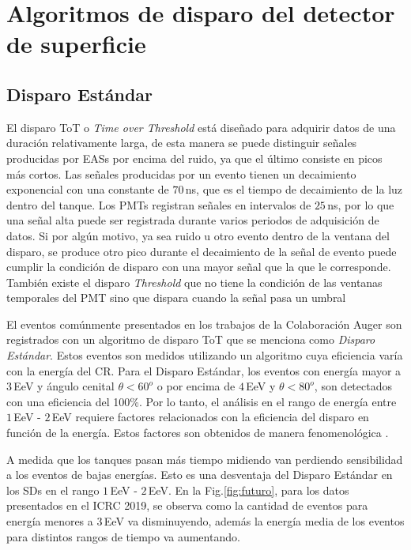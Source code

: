 \section{Algoritmos de disparo del detector de superficie} \label{triggers_caracteristicas}

\subsection{Disparo Estándar}

El disparo ToT o \emph{Time over Threshold} está diseñado para adquirir datos de una duración relativamente larga, de esta manera se puede distinguir señales producidas por EASs por encima del ruido, ya que el último consiste en picos más cortos. Las señales producidas por un evento tienen un decaimiento exponencial con una constante de $70\,$ns, que es el tiempo de decaimiento de la luz dentro del tanque. Los PMTs registran señales en intervalos de $25\,$ns, por lo que una señal alta puede ser registrada durante varios periodos de adquisición de datos. Si por algún motivo, ya sea ruido u otro evento dentro de la ventana del disparo, se produce otro pico durante el decaimiento de la señal de evento puede cumplir la condición de disparo con una mayor señal que la que le corresponde. También existe el disparo \emph{Threshold} que no tiene la condición de las ventanas temporales del PMT sino que dispara cuando la señal pasa un umbral

{El eventos comúnmente presentados en los trabajos de la Colaboración Auger son registrados con un algoritmo de disparo ToT que se menciona como \emph{Disparo Estándar}.  Estos eventos son medidos utilizando un algoritmo cuya eficiencia varía con la energía del CR. Para el Disparo Estándar, los eventos con energía mayor a $3\,$EeV y ángulo cenital $\theta<60^o$ o  por encima de $4\,$EeV y $\theta<80^o$, son detectados con una eficiencia del 100\%. Por lo tanto, el análisis en el rango de energía entre $1\,$EeV - $2\,$EeV requiere factores relacionados con la eficiencia del disparo en función de la energía. Estos factores son obtenidos de manera fenomenológica \cite{taborda}.}


A medida que los tanques pasan más tiempo midiendo van perdiendo sensibilidad a los eventos de bajas energías. Esto es una desventaja del Disparo Estándar en los SDs en el rango $1\,$EeV - $2\,$EeV.  En la Fig.\ref{fig:futuro}, para los datos presentados en el ICRC 2019, se observa como la cantidad de eventos para energía menores a $3\,$EeV va disminuyendo, además la energía media de los eventos para distintos rangos de tiempo va aumentando.

